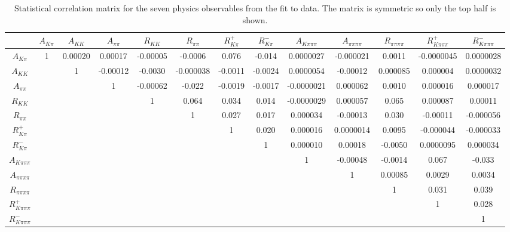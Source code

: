 \begin{table}
\centering
{\footnotesize
\begin{tabular}{c|cccccccccccc} 
\hline 
& $A_{K\pi}$ & $A_{KK}$ & $A_{\pi\pi}$ & $R_{KK}$ & $R_{\pi\pi}$ & $R^+_{K\pi}$ & $R^-_{K\pi}$ & $A_{K\pi\pi\pi}$ & $A_{\pi\pi\pi\pi}$ & $R_{\pi\pi\pi\pi}$ & $R^+_{K\pi\pi\pi}$ & $R^-_{K\pi\pi\pi}$ \\ 
 \hline
$A_{K\pi}$ & 1 & 0.00020  & 0.00017  & -0.00005  & -0.0006  & 0.076  & -0.014  & 0.0000027  & -0.000021  & 0.0011  & -0.0000045  & 0.0000028  \\
$A_{KK}$ & & 1  & -0.00012  & -0.0030  & -0.000038  & -0.0011  & -0.0024  & 0.0000054  & -0.00012  & 0.000085  & 0.000004  & 0.0000032  \\
$A_{\pi\pi}$ &  &  & 1  & -0.00062  & -0.022  & -0.0019  & -0.0017  & -0.0000021  & 0.000062  & 0.0010  & 0.000016  & 0.000017  \\
$R_{KK}$ & & & & 1  & 0.064  & 0.034  & 0.014  & -0.0000029  & 0.000057  & 0.065  & 0.000087  & 0.00011  \\
$R_{\pi\pi}$ & & & & & 1  & 0.027  & 0.017  & 0.000034  & -0.00013  & 0.030  & -0.00011  & -0.000056  \\
$R^+_{K\pi}$ & & & & & & 1  & 0.020  & 0.000016  & 0.0000014  & 0.0095  & -0.000044  & -0.000033 \\
$R^-_{K\pi}$ & & & & & & & 1  & 0.000010  & 0.00018  & -0.0050  & 0.0000095  & 0.000034  \\
$A_{K\pi\pi\pi}$ & & & & & & & & 1  & -0.00048  & -0.0014  & 0.067  & -0.033  \\
$A_{\pi\pi\pi\pi}$ & & & & & & & & & 1  & 0.00085  & 0.0029  & 0.0034  \\
$R_{\pi\pi\pi\pi}$ & & & & & & & & & & 1  & 0.031  & 0.039  \\
$R^+_{K\pi\pi\pi}$ & & & & & & & & & & & 1  & 0.028  \\
$R^-_{K\pi\pi\pi}$ & & & & & & & & & & & & 1  \\
\hline 
\end{tabular}}
\caption{Statistical correlation matrix for the seven physics observables from the \CP fit to data. The matrix is symmetric so only the top half is shown.}
\label{statisticalcorrelations}
\end{table}
